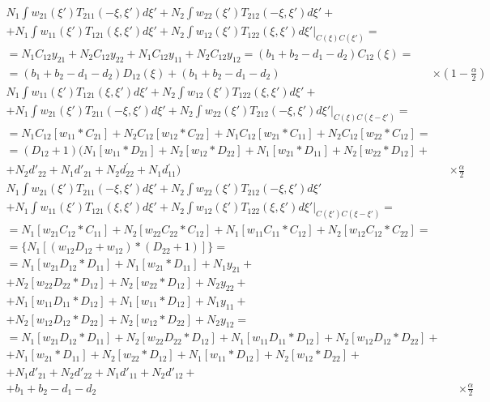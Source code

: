 \begin{align*}
N_{1}\int w_{21}(\xi')T_{211}(-\xi,\xi')d\xi'+N_{2}\int w_{22}(\xi')T_{212}(-\xi,\xi')d\xi'+		\\
+N_{1}\int w_{11}(\xi')T_{121}(\xi,\xi')d\xi'+N_{2}\int w_{12}(\xi')T_{122}(\xi,\xi')d\xi'	|_{C(\xi)C(\xi')}=	\\
=N_{1}C_{12}y_{21}+N_{2}C_{12}y_{22}+N_{1}C_{12}y_{11}+N_{2}C_{12}y_{12}=(b_{1}+b_{2}-d_{1}-d_{2})C_{12}(\xi)	=	\\
=(b_{1}+b_{2}-d_{1}-d_{2})D_{12}(\xi)+(b_{1}+b_{2}-d_{1}-d_{2}) &&		\times(1-\frac{\alpha}{2})
\end{align*}
\begin{align*}
N_{1}\int w_{11}(\xi')T_{121}(\xi,\xi')d\xi'+N_{2}\int w_{12}(\xi')T_{122}(\xi,\xi')d\xi'+		\\
+N_{1}\int w_{21}(\xi')T_{211}(-\xi,\xi')d\xi'+N_{2}\int w_{22}(\xi')T_{212}(-\xi,\xi')d\xi'|_{C(\xi)C(\xi-\xi')}	=	\\
=N_{1}C_{12}[w_{11}*C_{21}]+N_{2}C_{12}[w_{12}*C_{22}]+N_{1}C_{12}[w_{21}*C_{11}]+N_{2}C_{12}[w_{22}*C_{12}]	= \\	
=(D_{12}+1)(N_{1}[w_{11}*D_{21}]+N_{2}[w_{12}*D_{22}]+N_{1}[w_{21}*D_{11}]+N_{2}[w_{22}*D_{12}]+ \\		
+N_{2}d'_{22}+N_{1}d'_{21}+N_{2}d_{22}^{'}+N_{1}d{}_{11}^{'})		&& \times\frac{\alpha}{2}
\end{align*}
\begin{align*}
N_{1}\int w_{21}(\xi')T_{211}(-\xi,\xi')d\xi'+N_{2}\int w_{22}(\xi')T_{212}(-\xi,\xi')d\xi'		\\
+N_{1}\int w_{11}(\xi')T_{121}(\xi,\xi')d\xi'+N_{2}\int w_{12}(\xi')T_{122}(\xi,\xi')d\xi'|_{C(\xi')C(\xi-\xi')}	=	\\
=N_{1}[w_{21}C_{12}*C_{11}]+N_{2}[w_{22}C_{22}*C_{12}]+N_{1}[w_{11}C_{11}*C_{12}]+N_{2}[w_{12}C_{12}*C_{22}]	=	\\
=\{N_{1}[(w_{12}D_{12}+w_{12})*(D_{22}+1)]\}	=	\\
=N_{1}[w_{21}D_{12}*D_{11}]+N_{1}[w_{21}*D_{11}]+N_{1}y_{21}	+	\\
+N_{2}[w_{22}D_{22}*D_{12}]+N_{2}[w_{22}*D_{12}]+N_{2}y_{22}	+	\\
+N_{1}[w_{11}D_{11}*D_{12}]+N_{1}[w_{11}*D_{12}]+N_{1}y_{11}	+	\\
+N_{2}[w_{12}D_{12}*D_{22}]+N_{2}[w_{12}*D_{22}]+N_{2}y_{12}	=	\\
=N_{1}[w_{21}D_{12}*D_{11}]+N_{2}[w_{22}D_{22}*D_{12}]+N_{1}[w_{11}D_{11}*D_{12}]+N_{2}[w_{12}D_{12}*D_{22}]	+	\\
+N_{1}[w_{21}*D_{11}]+N_{2}[w_{22}*D_{12}]+N_{1}[w_{11}*D_{12}]+N_{2}[w_{12}*D_{22}]	+	\\
+N_{1}d'_{21}+N_{2}d'_{22}+N_{1}d'_{11}+N_{2}d'_{12}	+	\\
+b_{1}+b_{2}-d_{1}-d_{2}	&&	\times\frac{\alpha}{2}
\end{align*}
